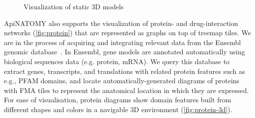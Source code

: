 \begin{figure}
\centering
  \vskip2mm
  \caption{Visualization of static 3D models}
  \label{fig:neurons}
\end{figure}

ApiNATOMY also supports the visualization of protein- and drug-interaction networks (\cref{fig:protein}) that are represented as graphs on top of treemap tiles. We are in the process of acquiring and integrating relevant data from the Ensembl genomic database~\cite{Ensemble}. In Ensembl, gene models are annotated automatically using biological sequences data (e.g. protein, mRNA). We query this database to extract genes, transcripts, and translations with related protein features such as e.g., PFAM domains, and locate automatically-generated diagrams of proteins with FMA tiles to represent the anatomical location in which they are expressed. For ease of visualisation, protein diagrams show domain features built from different shapes and colors in a navigable 3D environment (\cref{fig:protein-3d}).


